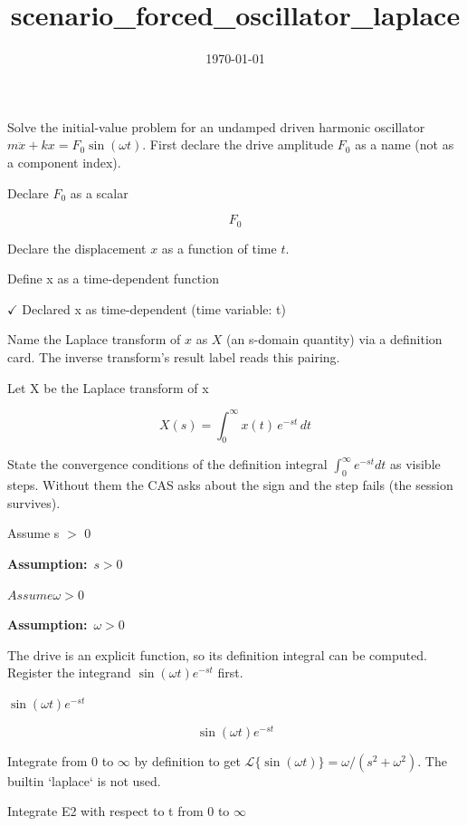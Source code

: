 \documentclass[dvipdfmx]{article}
\title{scenario\_forced\_oscillator\_laplace}
\date{\today}
\begin{document}
\maketitle

Solve the initial-value problem for an undamped driven harmonic oscillator $m\ddot x + kx = F_0\sin(\omega t)$. First declare the drive amplitude $F_0$ as a name (not as a component index).

Declare $F_0$ as a scalar

\[
  F_0
\]

Declare the displacement $x$ as a function of time $t$.

Define x as a time-dependent function

$\checkmark$ Declared x as time-dependent (time variable: t)

Name the Laplace transform of $x$ as $X$ (an s-domain quantity) via a definition card. The inverse transform's result label reads this pairing.

Let X be the Laplace transform of x

\begin{equation}
  X(s) = \int_0^{\infty} x(t)\, e^{-s t}\, dt
  \label{eq:E1}
\end{equation}

State the convergence conditions of the definition integral $\int_0^\infty e^{-st}dt$ as visible steps. Without them the CAS asks about the sign and the step fails (the session survives).

Assume s $>$ 0

\noindent\textbf{Assumption:}\ $\displaystyle s > 0$\par

$Assume \omega > 0$

\noindent\textbf{Assumption:}\ $\displaystyle \omega > 0$\par

The drive is an explicit function, so its definition integral can be computed. Register the integrand $\sin(\omega t)e^{-st}$ first.

$\sin(\omega t) e^{-s t}$

\begin{equation}
  \sin(\omega t) e^{-s t}
  \label{eq:E2}
\end{equation}

Integrate from $0$ to $\infty$ by definition to get $\mathcal L\{\sin(\omega t)\} = \omega/(s^2+\omega^2)$. The builtin `laplace` is not used.

Integrate E2 with respect to t from 0 to $\infty$
\end{document}
